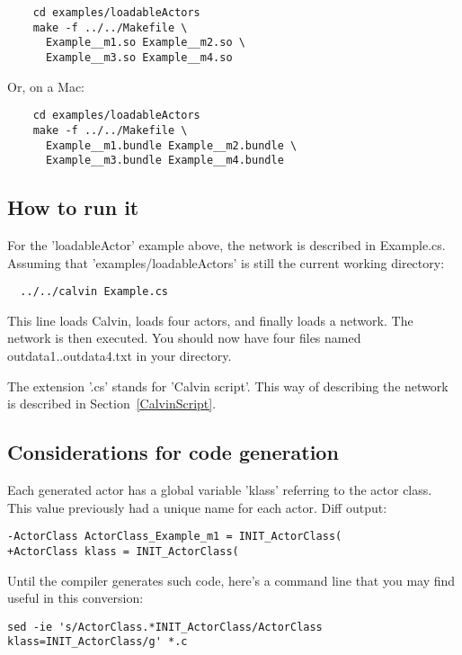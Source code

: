 \documentclass[10pt, a4paper]{article}
\begin{document}
\begin{verbatim}
    cd examples/loadableActors
    make -f ../../Makefile \
      Example__m1.so Example__m2.so \
      Example__m3.so Example__m4.so
\end{verbatim}

   Or, on a Mac:

\begin{verbatim}
    cd examples/loadableActors
    make -f ../../Makefile \
      Example__m1.bundle Example__m2.bundle \
      Example__m3.bundle Example__m4.bundle
\end{verbatim}

\subsection{How to run it}

For the 'loadableActor' example above, the network is described in
Example.cs. Assuming that 'examples/loadableActors' is still the
current working directory:

\begin{verbatim}
  ../../calvin Example.cs
\end{verbatim}

This line loads Calvin, loads four actors, and finally loads a
network. The network is then executed. You should now have four files
named outdata1..outdata4.txt in your directory.

The extension '.cs' stands for 'Calvin script'. This way of describing
the network is described in Section~\ref{CalvinScript}.

\subsection{Considerations for code generation}

Each generated actor has a global variable 'klass' referring to the actor class. This value previously had a unique name for each actor. Diff output:

\begin{verbatim}
-ActorClass ActorClass_Example_m1 = INIT_ActorClass(
+ActorClass klass = INIT_ActorClass(
\end{verbatim}

Until the compiler generates such code, here's a command line that you may find useful in this conversion:

\begin{verbatim}
sed -ie 's/ActorClass.*INIT_ActorClass/ActorClass klass=INIT_ActorClass/g' *.c
\end{verbatim}
\end{document}
